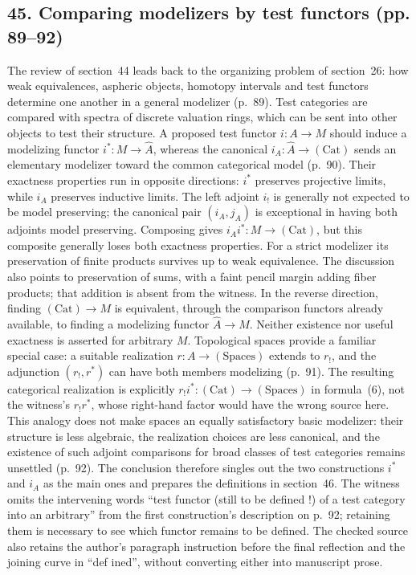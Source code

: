 \subsection*{45. Comparing modelizers by test functors (pp. 89--92)}
The review of section~44 leads back to the organizing problem of section~26: how weak equivalences, aspheric objects, homotopy intervals and test functors determine one another in a general modelizer (p.~89). Test categories are compared with spectra of discrete valuation rings, which can be sent into other objects to test their structure. A proposed test functor $i:A\to M$ should induce a modelizing functor $i^*:M\to\widehat A$, whereas the canonical $i_A:\widehat A\to(\mathrm{Cat})$ sends an elementary modelizer toward the common categorical model (p.~90). Their exactness properties run in opposite directions: $i^*$ preserves projective limits, while $i_A$ preserves inductive limits. The left adjoint $i_!$ is generally not expected to be model preserving; the canonical pair $(i_A,j_A)$ is exceptional in having both adjoints model preserving. Composing gives $i_Ai^*:M\to(\mathrm{Cat})$, but this composite generally loses both exactness properties. For a strict modelizer its preservation of finite products survives up to weak equivalence. The discussion also points to preservation of sums, with a faint pencil margin adding fiber products; that addition is absent from the witness. In the reverse direction, finding $(\mathrm{Cat})\to M$ is equivalent, through the comparison functors already available, to finding a modelizing functor $\widehat A\to M$. Neither existence nor useful exactness is asserted for arbitrary $M$. Topological spaces provide a familiar special case: a suitable realization $r:A\to(\mathrm{Spaces})$ extends to $r_!$, and the adjunction $(r_!,r^*)$ can have both members modelizing (p.~91). The resulting categorical realization is explicitly $r_!i^*:(\mathrm{Cat})\to(\mathrm{Spaces})$ in formula~(6), not the witness's $r_!r^*$, whose right-hand factor would have the wrong source here. This analogy does not make spaces an equally satisfactory basic modelizer: their structure is less algebraic, the realization choices are less canonical, and the existence of such adjoint comparisons for broad classes of test categories remains unsettled (p.~92). The conclusion therefore singles out the two constructions $i^*$ and $i_A$ as the main ones and prepares the definitions in section~46. The witness omits the intervening words ``test functor (still to be defined !) of a test category into an arbitrary'' from the first construction's description on p.~92; retaining them is necessary to see which functor remains to be defined. The checked source also retains the author's paragraph instruction before the final reflection and the joining curve in ``def ined'', without converting either into manuscript prose.

